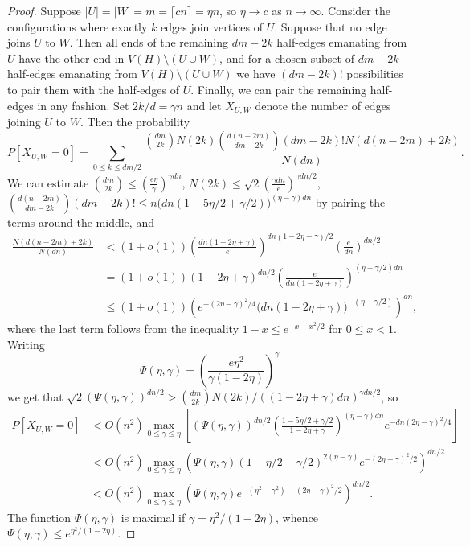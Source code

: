 \documentclass[12pt,a4paper]{article}
\begin{document}
\begin{proof}
Suppose $|U|=|W|=m=\lceil cn\rceil=\eta n$, so $\eta\to c$ as $n\to\infty$. Consider the
configurations where exactly $k$ edges join vertices of $U$. Suppose that no edge joins
$U$ to $W$. Then all ends of the remaining $dm-2k$ half-edges emanating from $U$ have
the other end in $V(H)\setminus(U\cup W)$, and for a chosen subset of $dm-2k$ half-edges
emanating from $V(H)\setminus(U\cup W)$ we have $(dm-2k)!$ possibilities to pair them with
the half-edges of $U$. Finally, we can pair the remaining half-edges in any fashion.
Set $2k/d=\gamma n$ and let $X_{U,W}$ denote the number of edges joining $U$ to $W$. Then the
probability
\[
  P[X_{U,W}=0]=\sum_{0\le k\le dm/2}
  \frac{\binom{dm}{2k}N(2k)\binom{d(n-2m)}{dm-2k}(dm-2k)!N(d(n-2m)+2k)}{N(dn)}.
\]
We can estimate $\binom{dm}{2k}\le \left(\frac{e\eta}{\gamma}\right)^{\gamma dn}$,
$N(2k)\le \sqrt{2}\left(\frac{\gamma dn}{e}\right)^{\gamma dn/2}$,
$\binom{d(n-2m)}{dm-2k}(dm-2k)!\le n\bigl(dn(1-5\eta/2+\gamma/2)\bigr)^{(\eta-\gamma)dn}$
by pairing the terms around the middle, and
\begin{align*}
  \frac{N(d(n-2m)+2k)}{N(dn)}
  &<(1+o(1))\left(\frac{dn(1-2\eta+\gamma)}{e}\right)^{dn(1-2\eta+\gamma)/2}
    \left(\frac{e}{dn}\right)^{dn/2} \\
  &= (1+o(1))(1-2\eta+\gamma)^{dn/2}\left(\frac{e}{dn(1-2\eta+\gamma)}\right)^{(\eta-\gamma/2)dn} \\
  &\le (1+o(1))\left(e^{-(2\eta-\gamma)^2/4}\bigl(dn(1-2\eta+\gamma)\bigr)^{-(\eta-\gamma/2)}\right)^{dn},
\end{align*}
where the last term follows from the inequality $1-x\le e^{-x-x^2/2}$ for $0\le x<1$.
Writing
\[
  \Psi(\eta,\gamma)=\left(\frac{e\eta^2}{\gamma(1-2\eta)}\right)^\gamma
\]
we get that $\sqrt{2}(\Psi(\eta,\gamma))^{dn/2}>\binom{dm}{2k}N(2k)/((1-2\eta+\gamma)dn)^{\gamma dn/2}$, so
\begin{align*}
  P[X_{U,W}=0]
  &< O(n^2)\max_{0\le \gamma\le \eta}
     \left[(\Psi(\eta,\gamma))^{dn/2}
     \left(\frac{1-5\eta/2+\gamma/2}{1-2\eta+\gamma}\right)^{(\eta-\gamma)dn}
     e^{-dn(2\eta-\gamma)^2/4}\right] \\
  &< O(n^2)\max_{0\le \gamma\le \eta}
     \left(\Psi(\eta,\gamma)(1-\eta/2-\gamma/2)^{2(\eta-\gamma)}e^{-(2\eta-\gamma)^2/2}\right)^{dn/2} \\
  &< O(n^2)\max_{0\le \gamma\le \eta}
     \left(\Psi(\eta,\gamma)e^{-(\eta^2-\gamma^2)-(2\eta-\gamma)^2/2}\right)^{dn/2}.
\end{align*}
The function $\Psi(\eta,\gamma)$ is maximal if $\gamma=\eta^2/(1-2\eta)$, whence $\Psi(\eta,\gamma)\le e^{\eta^2/(1-2\eta)}$.

\end{proof}
\end{document}
